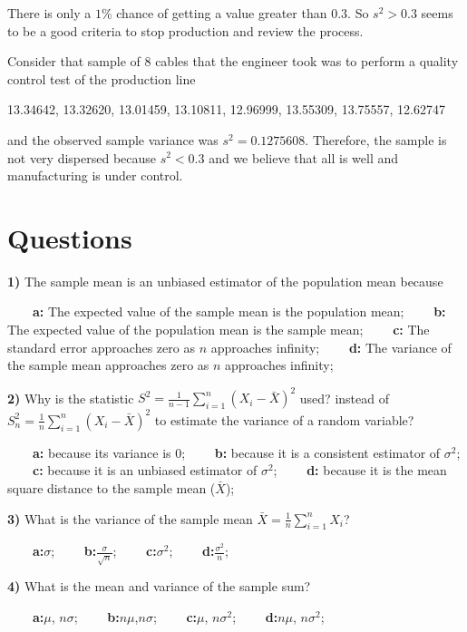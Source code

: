\documentclass[
]{book}
\begin{document}
There is only a \(1\%\) chance of getting a value greater than \(0.3\). So \(s^2>0.3\) seems to be a good criteria to stop production and review the process.

Consider that sample of \(8\) cables that the engineer took was to perform a quality control test of the production line

13.34642, 13.32620, 13.01459, 13.10811, 12.96999, 13.55309, 13.75557, 12.62747

and the observed sample variance was \(s^2=0.1275608\). Therefore, the sample is not very dispersed because \(s^2 < 0.3\) and we believe that all is well and manufacturing is under control.

\hypertarget{questions-7}{%
\section{Questions}\label{questions-7}}

\textbf{1)} The sample mean is an unbiased estimator of the population mean because

\textbf{\(\qquad\)a:} The expected value of the sample mean is the population mean;
\textbf{\(\qquad\)b:} The expected value of the population mean is the sample mean;
\textbf{\(\qquad\)c:} The standard error approaches zero as \(n\) approaches infinity;
\textbf{\(\qquad\)d:} The variance of the sample mean approaches zero as \(n\) approaches infinity;

\textbf{2)} Why is the statistic \(S^2=\frac{1}{n-1}\sum_{i=1}^{n}(X_i -\bar{X})^2\) used? instead of \(S_n^2=\frac{1}{n}\sum_{i=1}^{n}(X_i -\bar{X})^2\) to estimate the variance of a random variable?

\textbf{\(\qquad\)a:} because its variance is \(0\);
\textbf{\(\qquad\)b:} because it is a consistent estimator of \(\sigma^2\);
\textbf{\(\qquad\)c:} because it is an unbiased estimator of \(\sigma^2\);
\textbf{\(\qquad\)d:} because it is the mean square distance to the sample mean (\(\bar{X}\));

\textbf{3)} What is the variance of the sample mean \(\bar{X}=\frac{1}{n}\sum_{i=1}^n X_i\)?

\textbf{\(\qquad\)a:}\(\sigma\);
\textbf{\(\qquad\)b:}\(\frac{\sigma}{\sqrt{n}}\);
\textbf{\(\qquad\)c:}\(\sigma^2\);
\textbf{\(\qquad\)d:}\(\frac{\sigma^2}{n}\);

\textbf{4)} What is the mean and variance of the sample sum?

\textbf{\(\qquad\)a:}\(\mu\), \(n\sigma\);
\textbf{\(\qquad\)b:}\(n\mu\),\(n\sigma\);
\textbf{\(\qquad\)c:}\(\mu\), \(n\sigma^2\);
\textbf{\(\qquad\)d:}\(n\mu\), \(n\sigma^2\);
\end{document}
